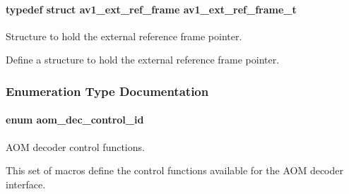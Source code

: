 \paragraph[{\texorpdfstring{av1\+\_\+ext\+\_\+ref\+\_\+frame\+\_\+t}{av1_ext_ref_frame_t}}]{\setlength{\rightskip}{0pt plus 5cm}typedef struct {\bf av1\+\_\+ext\+\_\+ref\+\_\+frame}  {\bf av1\+\_\+ext\+\_\+ref\+\_\+frame\+\_\+t}}\hypertarget{group__aom__decoder_ga83fa00a891fa821cd5eb1c15ffd7287b}{}\label{group__aom__decoder_ga83fa00a891fa821cd5eb1c15ffd7287b}


Structure to hold the external reference frame pointer. 

Define a structure to hold the external reference frame pointer. 

\subsubsection{Enumeration Type Documentation}
\paragraph[{\texorpdfstring{aom\+\_\+dec\+\_\+control\+\_\+id}{aom_dec_control_id}}]{\setlength{\rightskip}{0pt plus 5cm}enum {\bf aom\+\_\+dec\+\_\+control\+\_\+id}}\hypertarget{group__aom__decoder_ga3865fd4b3192489baa9a5c3632ebe97b}{}\label{group__aom__decoder_ga3865fd4b3192489baa9a5c3632ebe97b}


A\+OM decoder control functions. 

This set of macros define the control functions available for the A\+OM decoder interface.

